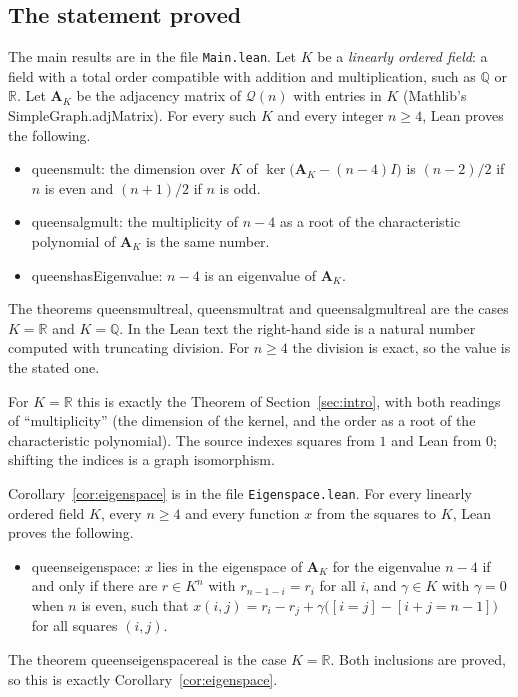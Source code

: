 \documentclass[11pt]{amsart}
\theoremstyle{plain}
\theoremstyle{definition}
\theoremstyle{remark}
\numberwithin{equation}{section}
\newcommand{\QG}{\mathcal{Q}}          %
\newcommand{\Adj}{\mathbf{A}}          %
\newcommand{\R}{\mathbb{R}}
\newcommand{\iv}[1]{[#1]}              %
\newcommand{\leanus}{\textunderscore\allowbreak}
\newcommand{\lean}[1]{{\ttfamily\let\_\leanus #1}}  %
\begin{document}
\subsection{The statement proved}
The main results are in the file \nolinkurl{Main.lean}. Let \(K\) be a \emph{linearly
ordered field}: a field with a total order compatible with addition and multiplication,
such as \(\mathbb{Q}\) or \(\R\). Let \(\Adj_K\) be the adjacency matrix of \(\QG(n)\)
with entries in \(K\) (Mathlib's \lean{SimpleGraph.adjMatrix}). For every such
\(K\) and every integer \(n\ge4\), Lean proves the following.
\begin{itemize}
\item \lean{queens\_mult}: the dimension over \(K\) of
\(\ker\bigl(\Adj_K-(n-4)I\bigr)\) is \((n-2)/2\) if \(n\) is even and \((n+1)/2\) if \(n\)
is odd.
\item \lean{queens\_alg\_mult}: the multiplicity of \(n-4\) as a root of the
characteristic polynomial of \(\Adj_K\) is the same number.
\item \lean{queens\_hasEigenvalue}: \(n-4\) is an eigenvalue of \(\Adj_K\).
\end{itemize}
The theorems \lean{queens\_mult\_real}, \lean{queens\_mult\_rat} and
\lean{queens\_alg\_mult\_real} are the cases \(K=\R\) and \(K=\mathbb{Q}\). In the
Lean text the right-hand side is a natural number computed with truncating division.
For \(n\ge4\) the division is exact, so the value is the stated one.

For \(K=\R\) this is exactly the Theorem of Section~\ref{sec:intro}, with both readings of
``multiplicity'' (the dimension of the kernel, and the order as a root of the
characteristic polynomial). The source indexes squares from \(1\) and Lean from \(0\);
shifting the indices is a graph isomorphism.

Corollary~\ref{cor:eigenspace} is in the file \nolinkurl{Eigenspace.lean}. For every
linearly ordered field \(K\), every \(n\ge4\) and every function \(x\) from the squares
to \(K\), Lean proves the following.
\begin{itemize}
\item \lean{queens\_eigenspace}: \(x\) lies in the eigenspace of \(\Adj_K\) for the
eigenvalue \(n-4\) if and only if there are \(r\in K^n\) with \(r_{n-1-i}=r_i\) for all
\(i\), and \(\gamma\in K\) with \(\gamma=0\) when \(n\) is even, such that
\(x(i,j)=r_i-r_j+\gamma\bigl(\iv{i=j}-\iv{i+j=n-1}\bigr)\) for all squares \((i,j)\).
\end{itemize}
The theorem \lean{queens\_eigenspace\_real} is the case \(K=\R\). Both inclusions are
proved, so this is exactly Corollary~\ref{cor:eigenspace}.
\end{document}
